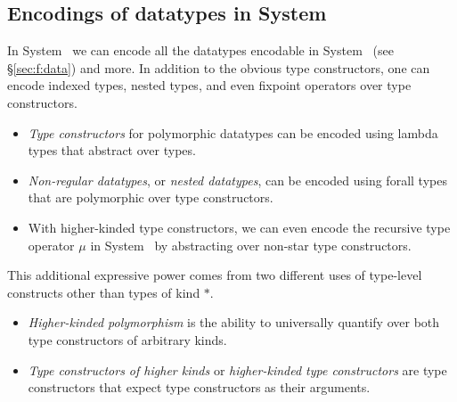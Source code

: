 

\subsection{Encodings of datatypes in System \Fw}
\label{sec:fw:data}
In System \Fw\ we can encode all the datatypes encodable in System \F\ (see
\S\ref{sec:f:data}) and more. In addition to the obvious type constructors,
one can encode indexed types, nested types, and even fixpoint operators
over type constructors.
\begin{itemize}

\item \emph{Type constructors} for polymorphic datatypes
can be encoded using lambda types that abstract over types.


\item \emph{Non-regular datatypes}, or \emph{nested datatypes}, can be encoded
using forall types that are polymorphic over type constructors.

\item With higher-kinded type constructors, we can even encode
the recursive type operator $\mu$ in System \Fw\ by abstracting
over non-star type constructors.
\end{itemize}

This additional expressive power comes from two different uses of
type-level constructs other than types of kind $*$.
\begin{itemize}

\item  \emph{Higher-kinded polymorphism} is the ability to
	universally quantify over both type constructors
	of arbitrary kinds.

\item 
\emph{Type constructors of higher kinds} or \emph{higher-kinded
type constructors} are type constructors that expect type constructors
as their arguments.
\end{itemize}

